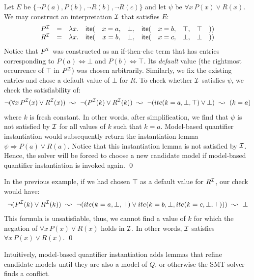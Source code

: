 \documentclass{easychair}
\begin{document}
\begin{example}
Let $E$ be $\{ \neg P( a ), P( b ), \neg R( b ), \neg R( c ) \}$ and let $\psi$ be $\forall x\, P( x ) \vee R( x )$.
We may construct an interpretation $\mathcal{I}$ that satisfies $E$:
\[
\begin{array}{rcccccccccc}
P^{\mathcal{I}} & = & \lambda x. & \mathsf{ite}( & x=a, & \bot, & \mathsf{ite}( & x=b, & \top, & \top  & )) \\
R^{\mathcal{I}} & = & \lambda x. & \mathsf{ite}( & x=b, & \bot, & \mathsf{ite}( & x=c, & \bot, & \bot  & )) \\
\end{array}
\]
Notice that $P^{\mathcal{I}}$ was constructed as an if-then-else term that has entries corresponding to $P( a ) \Leftrightarrow \bot$
and $P( b ) \Leftrightarrow \top$. Its \emph{default} value (the rightmost occurrence of $\top$ in $P^{\mathcal{I}}$) was chosen arbitrarily.
Similarly, we fix the existing entries and chose a default value of $\bot$ for $R$.
To check whether $\mathcal{I}$ satisfies $\psi$, we check the satisfiability of:
\[
\neg ( \forall x\, P^{\mathcal{I}}( x ) \vee R^{\mathcal{I}}( x ) ) \ \leadsto \  \neg ( P^{\mathcal{I}}( k ) \vee R^{\mathcal{I}}( k ) ) \ \leadsto \  \neg ( ite( k=a, \bot, \top) \vee \bot ) \ \leadsto \  ( k = a )
\]
where $k$ is fresh constant.
In other words, after simplification, we find that $\psi$ is not satisfied by $\mathcal{I}$ for all values of $k$ such that $k = a$.
Model-based quantifier instantiation would subsequently return the instantiation lemma $\psi \Rightarrow P( a ) \vee R( a )$.
Notice that this instantiation lemma is not satisfied by $\mathcal{I}$.
Hence, the solver will be forced to choose a new candidate model 
if model-based quantifier instantiation is invoked again.
\qed
\end{example}
\begin{example}
In the previous example, if we had chosen $\top$ as a default value for $R^{\mathcal{I}}$, our check would have:
\[
\neg ( P^{\mathcal{I}}( k ) \vee R^{\mathcal{I}}( k ) ) \ \leadsto \  \neg ( ite( k=a, \bot, \top) \vee ite( k=b, \bot, ite( k=c, \bot, \top)) ) \ \leadsto \  \bot
\]
This formula is unsatisfiable, thus, we cannot find a value of $k$ for which the negation of $\forall x\, P( x ) \vee R( x )$ holds in $\mathcal{I}$.
In other words, $\mathcal{I}$ satisfies $\forall x\, P( x ) \vee R( x )$.
\qed
\end{example}
Intuitively,
model-based quantifier instantiation adds lemmas that refine candidate models
until they are also a model of $Q$, or otherwise the SMT solver finds a conflict.
\end{document}
